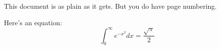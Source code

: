 \documentclass[12pt,twoside]{article}
\begin{document}




This document is as plain as it gets. But you do have page numbering.

Here's an equation:
\begin{equation}
    \int_{0}^{\infty} e^{-x^2} dx = \frac{\sqrt{\pi}}{2}
\end{equation}
\end{document}
